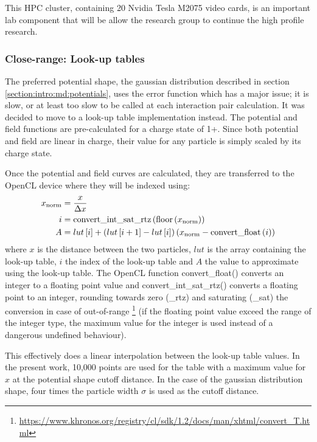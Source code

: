 This HPC cluster, containing 20 Nvidia Tesla M2075 video cards, is an important
lab component that will be allow the research group to continue the high profile
research.



\subsubsection{Close-range: Look-up tables}
\label{section:intro:lut}
The preferred potential shape, the gaussian distribution described in section
\ref{section:intro:md:potentials}, uses the error function which has a major
issue; it is slow, or at least too slow to be called at each interaction pair
calculation. It was decided to move to a look-up table implementation instead.
The potential and field functions are pre-calculated for a charge state of 1+.
Since both potential and field are linear in charge, their value for any
particle is simply scaled by its charge state.

Once the potential and field curves are calculated, they are transferred to the
OpenCL device where they will be indexed using:
\begin{align}
x_{\textrm{norm}} & = \frac{x}{\Delta x} \\
i   & = \textrm{convert\_int\_sat\_rtz}\left( \textrm{floor}\left( x_{\textrm{norm}} \right) \right) \\
A   &= lut\left[ i \right] + \left( lut\left[ i+1 \right]-lut\left[ i \right] \right) \left( x_{\textrm{norm}}-\textrm{convert\_float}\left( i \right) \right)
\end{align}
where $x$ is the distance between the two particles, $lut$ is the array
containing the look-up table, $i$ the index of the look-up table and $A$ the
value to approximate using the look-up table. The OpenCL function
convert\_float() converts an integer to a floating point value
and convert\_int\_sat\_rtz() converts a floating point to an integer,
rounding towards zero (\_rtz) and saturating (\_sat) the conversion in case of
out-of-range
\footnote{\url{https://www.khronos.org/registry/cl/sdk/1.2/docs/man/xhtml/convert_T.html}}
(if the floating point value exceed the range of the integer type,
the maximum value for the integer is used instead of a dangerous undefined
behaviour).

This effectively does a linear interpolation between the look-up table values.
In the present work, 10,000 points are used for the table with a maximum value
for $x$ at the potential shape cutoff distance. In the case of the gaussian
distribution shape, four times the particle width $\sigma$ is used as the cutoff
distance.


